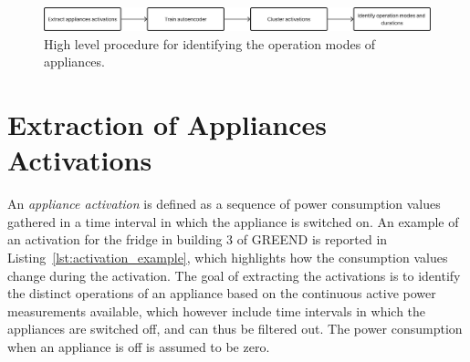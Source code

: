 \begin{figure}
    \centering
    \includegraphics[width=\linewidth]{images/high_level_procedure.png}
    \caption{High level procedure for identifying the operation modes of appliances.}
    \label{fig:high_level_procedure}
\end{figure}

\section{Extraction of Appliances Activations}

An \textit{appliance activation} is defined as a sequence of power consumption values gathered in a time interval in which the appliance is switched on. An example of an activation for the fridge in building 3 of GREEND is reported in Listing~\ref{lst:activation_example}, which highlights how the consumption values change during the activation. The goal of extracting the activations is to identify the distinct operations of an appliance based on the continuous active power measurements available, which however include time intervals in which the appliances are switched off, and can thus be filtered out. The power consumption when an appliance is off is assumed to be zero.

